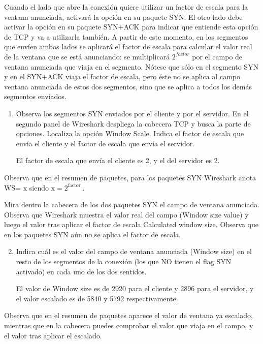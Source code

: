 \documentclass[12pt, a4paper]{report}
\begin{document}
Cuando el lado que abre la conexión quiere utilizar un factor de escala para la ventana anunciada, activará la opción en su paquete SYN. El otro lado debe activar la opción en su paquete SYN+ACK para indicar que entiende esta opción de TCP y va a utilizarla también. A partir de este momento, en los segmentos que envíen ambos lados se aplicará el factor de escala para calcular el valor real de la ventana que se está anunciando: se multiplicará $2^{f a c t o r}$ por el campo de ventana anunciada que viaja en el segmento. Nótese que sólo en el segmento SYN y en el SYN+ACK viaja el factor de escala, pero éste no se aplica al campo ventana anunciada de estos dos segmentos, sino que se aplica a todos los demás segmentos enviados.

\begin{enumerate}
	\item Observa los segmentos SYN enviados por el cliente y por el servidor. En el segundo panel de Wireshark despliega la cabecera TCP y busca la parte de opciones. Localiza la opción Window Scale. Indica el factor de escala que envía el cliente y el factor de escala que envía el servidor.
	
	El factor de escala que envía el cliente es 2, y el del servidor es 2.
\end{enumerate}

Observa que en el resumen de paquetes, para los paquetes SYN Wireshark anota WS= $\mathrm{x}$ siendo $\mathrm{x}=2^{\text {factor }}$.

Mira dentro la cabecera de los dos paquetes SYN el campo de ventana anunciada. Observa que Wireshark muestra el valor real del campo (Window size value) y luego el valor tras aplicar el factor de escala Calculated window size. Observa que en los paquetes SYN aún no se aplica el factor de escala.

\begin{enumerate}
	\setcounter{enumi}{1}
	\item Indica cuál es el valor del campo de ventana anunciada (Window size) en el resto de los segmentos de la conexión (los que NO tienen el flag SYN activado) en cada uno de los dos sentidos.
	
	El valor de Window size es de 2920 para el cliente y 2896 para el servidor, y el valor escalado es de 5840 y 5792 respectivamente.
\end{enumerate}

Observa que en el resumen de paquetes aparece el valor de ventana ya escalado, mientras que en la cabecera puedes comprobar el valor que viaja en el campo, y el valor tras aplicar el escalado.
\end{document}

